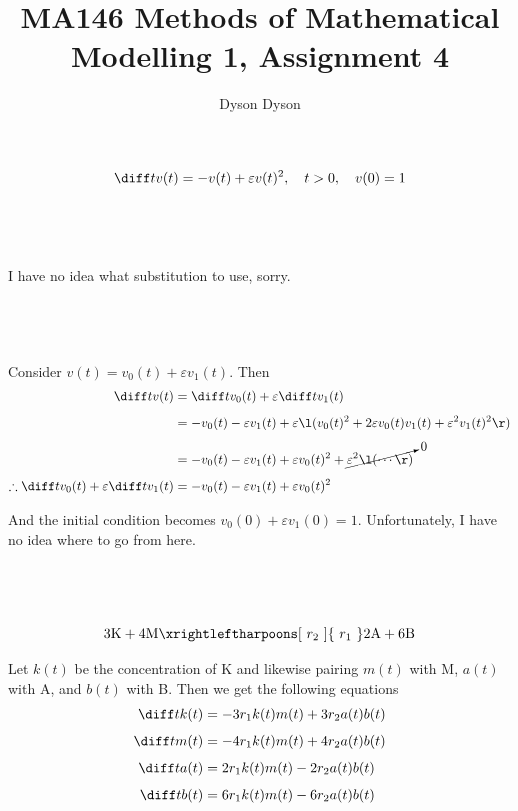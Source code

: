 \documentclass[a4paper]{article}
\title{MA146 Methods of Mathematical Modelling 1, Assignment 4}
\author{Dyson Dyson}
\date{}
\begin{document}
\maketitle

\setlength{\parindent}{0em}
\setlength{\parskip}{1em}


$$\diff t v(t) = -v(t) + \varepsilon v(t)^2, \quad t > 0, \quad v(0) = 1$$

\subsection{~}

I have no idea what substitution to use, sorry.

\subsection{~}

Consider $v(t) = v_0(t) + \varepsilon v_1(t)$. Then \begin{align*}
	\diff t v(t) &= \diff t v_0(t) + \varepsilon \diff t v_1(t)\\[1ex]
				 &= -v_0(t) - \varepsilon v_1(t) + \varepsilon \l(v_0(t)^2 + 2 \varepsilon v_0(t) v_1(t) + \varepsilon^2 v_1(t)^2 \r)\\[1ex]
				 &= -v_0(t) - \varepsilon v_1(t) + \varepsilon v_0(t)^2 + \cancelto{0}{\varepsilon^2 \l(\cdots\r)}\\[1ex]
	\therefore \diff t v_0(t) + \varepsilon \diff t v_1(t) &= -v_0(t) - \varepsilon v_1(t) + \varepsilon v_0(t)^2
\end{align*}

And the initial condition becomes $v_0(0) + \varepsilon v_1(0) = 1$. Unfortunately, I have no idea where to go from here.


\subsection{~}

$$3\text{K} + 4\text{M} \xrightleftharpoons[\ r_2\ ]{\ r_1\ } 2\text{A} + 6\text{B}$$

Let $k(t)$ be the concentration of K and likewise pairing $m(t)$ with M, $a(t)$ with A, and $b(t)$ with B. Then we get the following equations \begin{align*}
	\diff t k(t) &= -3 r_1 k(t) m(t) + 3 r_2 a(t) b(t)\\[1ex]
	\diff t m(t) &= -4 r_1 k(t) m(t) + 4 r_2 a(t) b(t)\\[1ex]
	\diff t a(t) &= 2 r_1 k(t) m(t) - 2 r_2 a(t) b(t)\\[1ex]
	\diff t b(t) &= 6 r_1 k(t) m(t) - 6 r_2 a(t) b(t)
\end{align*}
\end{document}

